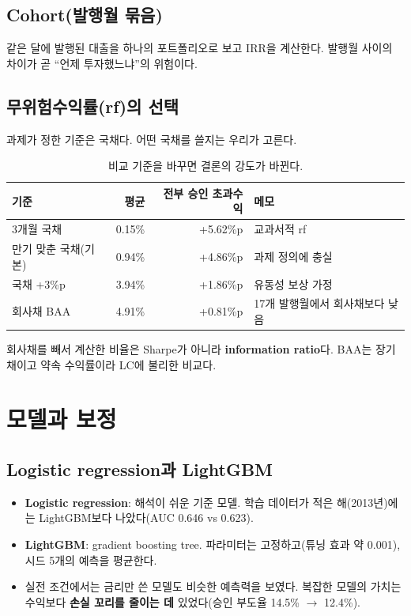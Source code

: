 \section{Cohort(발행월 묶음)}
같은 달에 발행된 대출을 하나의 포트폴리오로 보고 IRR을 계산한다. 발행월 사이의 차이가 곧 ``언제 투자했느냐''의 위험이다.

\section{무위험수익률(rf)의 선택}
과제가 정한 기준은 국채다. 어떤 국채를 쓸지는 우리가 고른다.
\begin{table}[H]\centering\small
\begin{tabularx}{\linewidth}{@{}lrrL@{}}\toprule
기준 & 평균 & 전부 승인 초과수익 & 메모\\\midrule
3개월 국채 & 0.15\% & +5.62\%p & 교과서적 rf\\
만기 맞춘 국채(기본) & 0.94\% & +4.86\%p & 과제 정의에 충실\\
국채 +3\%p & 3.94\% & +1.86\%p & 유동성 보상 가정\\
회사채 BAA & 4.91\% & +0.81\%p & 17개 발행월에서 회사채보다 낮음\\\bottomrule
\end{tabularx}
\caption{비교 기준을 바꾸면 결론의 강도가 바뀐다.}
\end{table}
\begin{warnbox}
회사채를 빼서 계산한 비율은 Sharpe가 아니라 \textbf{information ratio}다. BAA는 장기채이고 약속 수익률이라 LC에 불리한 비교다.
\end{warnbox}

\chapter{모델과 보정}

\section{Logistic regression과 LightGBM}
\begin{itemize}
\item \textbf{Logistic regression}: 해석이 쉬운 기준 모델. 학습 데이터가 적은 해(2013년)에는 LightGBM보다 나았다(AUC 0.646 vs 0.623).
\item \textbf{LightGBM}: gradient boosting tree. 파라미터는 고정하고(튜닝 효과 약 0.001), 시드 5개의 예측을 평균한다.
\item 실전 조건에서는 금리만 쓴 모델도 비슷한 예측력을 보였다. 복잡한 모델의 가치는 수익보다 \textbf{손실 꼬리를 줄이는 데} 있었다(승인 부도율 14.5\% \ensuremath{\to} 12.4\%).
\end{itemize}

